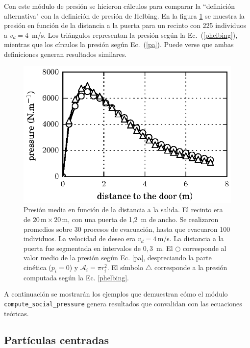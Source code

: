 Con este módulo de presión se hicieron cálculos para comparar la ``definición alternativa" con la definición de presión de Helbing. En la figura \ref{comparacion} se muestra la presión en función de la distancia a la puerta para un recinto con 225 individuos a $v_d=4$~m/s. Los triángulos representan la presión según la Ec.~(\ref{phelbing}), mientras que los círculos la presión según Ec.~(\ref{pa}). Puede verse que ambas definiciones generan resultados similares. 

\begin{figure}[H]
    \centering
    \includegraphics[scale=1]{figuras/fig16.eps}
    \caption[width=5cm]{Presión media en función de la distancia a la salida. El recinto era de $20\,\mathrm{m}\times20\,\mathrm{m}$, con una puerta de 1,2~m de ancho. Se realizaron promedios sobre 30 procesos de evacuación, hasta que evacuaron 100 individuos. La velocidad de deseo era $v_d=4\,$m/s. La distancia a la puerta fue segmentada en intervalos de $0,3$~m.  El $\bigcirc$  corresponde al valor medio de la presión según Ec. \ref{pa}, despreciando la parte cinética ($p_i=0$) y $\mathcal{A}_i=\pi r_i^2$. El símbolo $\bigtriangleup$ corresponde a la presión computada según la Ec. \ref{phelbing}. }
    \label{comparacion}
\end{figure}

A continuación se mostrarán los ejemplos que demuestran cómo el módulo    {\tt compute\_social\_pressure} genera resultados que convalidan con las ecuaciones teóricas.  

\subsection{Partículas centradas}

